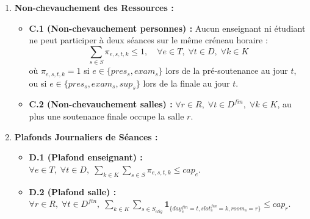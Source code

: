 \documentclass[10pt,a4paper]{article}
\begin{document}
\begin{enumerate}
\begin{itemize}
        \item \textbf{B.4 (Disponibilité salle physique) :} $\forall s \in S_{elig}, \; A^R_{room_s, day^{fin}_s, slot^{fin}_s} = 1$.
    \end{itemize}
    \item \textbf{Non-chevauchement des Ressources :}
    \begin{itemize}
        \item \textbf{C.1 (Non-chevauchement personnes) :} Aucun enseignant ni étudiant ne peut participer à deux séances sur le même créneau horaire :
        $$\sum_{s \in S} \pi_{e, s, t, k} \le 1, \quad \forall e \in T, \; \forall t \in D, \; \forall k \in K$$
        où $\pi_{e, s, t, k} = 1$ si $e \in \{pres_s, exam_s\}$ lors de la pré-soutenance au jour $t$, ou si $e \in \{pres_s, exam_s, sup_s\}$ lors de la finale au jour $t$.
        \item \textbf{C.2 (Non-chevauchement salles) :} $\forall r \in R, \; \forall t \in D^{fin}, \; \forall k \in K$, au plus une soutenance finale occupe la salle $r$.
    \end{itemize}
    \item \textbf{Plafonds Journaliers de Séances :}
    \begin{itemize}
        \item \textbf{D.1 (Plafond enseignant) :} $\forall e \in T, \; \forall t \in D, \; \sum_{k \in K} \sum_{s \in S} \pi_{e, s, t, k} \le cap_e$.
        \item \textbf{D.2 (Plafond salle) :} $\forall r \in R, \; \forall t \in D^{fin}, \; \sum_{k \in K} \sum_{s \in S_{elig}} \mathbf{1}_{\{day^{fin}_s=t, slot^{fin}_s=k, room_s=r\}} \le cap_r$.
    \end{itemize}
\end{enumerate}
\end{document}
